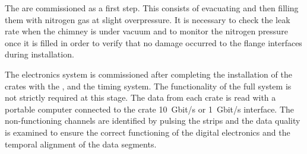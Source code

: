 The  are commissioned as a first step. This consists of evacuating and then filling them with nitrogen gas at slight overpressure. It is necessary to check the leak rate when the chimney is under vacuum and to monitor the nitrogen pressure once it is filled in order to verify that no damage occurred to the flange interfaces during installation.

The electronics system is commissioned after completing the installation of the  crates with the , and the timing system. The functionality of the full  system is not strictly required at this stage. The data from each crate is read with a portable computer connected to the crate  \SI{10}{Gbit/s} or \SI{1}{Gbit/s} interface. The non-functioning channels are identified by pulsing the  strips and the data quality is examined to ensure the correct functioning of the digital electronics and the temporal alignment of the data segments.   
